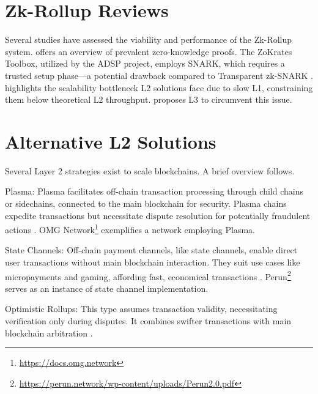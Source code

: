 \section{Zk-Rollup Reviews}
Several studies have assessed the viability and performance of the Zk-Rollup system. \cite{capko_state_2022} offers an overview of prevalent zero-knowledge proofs. The ZoKrates Toolbox, utilized by the ADSP project, employs SNARK, which requires a trusted setup phase—a potential drawback compared to Transparent zk-SNARK \cite{zhou_overview_2022}. \cite{neiheiser_practical_2023} highlights the scalability bottleneck L2 solutions face due to slow L1, constraining them below theoretical L2 throughput. \cite{starkware_fractal_2021} proposes L3 to circumvent this issue.

\section{Alternative L2 Solutions}
Several Layer 2 strategies exist to scale blockchains. A brief overview follows.

Plasma: Plasma facilitates off-chain transaction processing through child chains or sidechains, connected to the main blockchain for security. Plasma chains expedite transactions but necessitate dispute resolution for potentially fraudulent actions \cite{thibault_blockchain_2022}. OMG Network\footnote{\url{https://docs.omg.network}} exemplifies a network employing Plasma.

State Channels: Off-chain payment channels, like state channels, enable direct user transactions without main blockchain interaction. They suit use cases like micropayments and gaming, affording fast, economical transactions \cite{negka_blockchain_2021}. Perun\footnote{\url{https://perun.network/wp-content/uploads/Perun2.0.pdf}} serves as an instance of state channel implementation.

Optimistic Rollups: This type assumes transaction validity, necessitating verification only during disputes. It combines swifter transactions with main blockchain arbitration \cite{thibault_blockchain_2022}.
